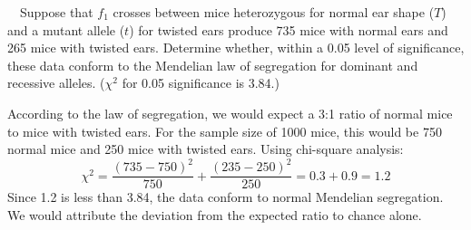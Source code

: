 \documentclass[hw,addpoints,noanswers]{exam}
\begin{document}
\begin{questions}
\question  Suppose that $f_1$ crosses between mice heterozygous for normal ear shape ($T$) and a mutant allele ($t$) for twisted ears produce 735 mice with normal ears and 265 mice with twisted ears. Determine whether, within a 0.05 level of significance, these data conform to the Mendelian law of segregation for dominant and recessive alleles. ($\chi^2$ for 0.05 significance is 3.84.)
\begin{solution}
According to the law of segregation, we would expect a 3:1 ratio of normal mice to mice with twisted ears. For the sample size of 1000 mice, this would be 750 normal mice and 250 mice with twisted ears. Using chi-square analysis:
\begin{equation*}
\chi^2 = \frac{(735-750)^2}{750}+\frac{(235-250)^2}{250}=0.3+0.9=1.2
\end{equation*}
Since 1.2 is less than 3.84, the data conform to normal Mendelian segregation. We would attribute the deviation from the expected ratio to chance alone.
\end{solution}
\end{questions}
\end{document}
